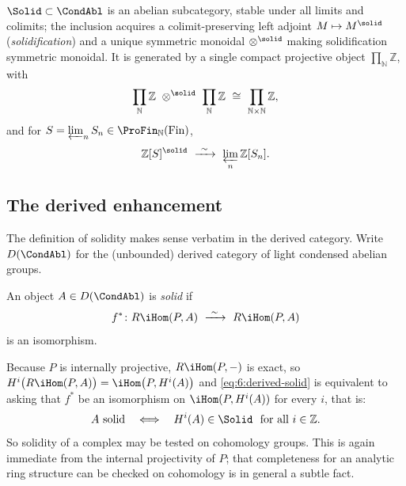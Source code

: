 \begin{theorem}
\label{thm:6:recall-structure}
$\Solid\subset\CondAbl$ is an abelian subcategory, stable under all limits and
colimits; the inclusion acquires a colimit-preserving left adjoint
$M\mapsto M^{\solid}$ (\emph{solidification}) and a unique symmetric monoidal
$\otimes^{\solid}$ making solidification symmetric monoidal. It is generated by a
single compact projective object $\prod_{\mathbb{N}}\mathbb{Z}$, with
\begin{equation}
\label{eq:6:generator-tensor-recall}
\prod_{\mathbb{N}}\mathbb{Z}\ \otimes^{\solid}\ \prod_{\mathbb{N}}\mathbb{Z}
\ \cong\ \prod_{\mathbb{N}\times\mathbb{N}}\mathbb{Z},
\end{equation}
and for $S=\varprojlim_n S_n\in\ProFin_{\mathbb{N}}(\mathrm{Fin})$,
\begin{equation*}
\mathbb{Z}[S]^{\solid}\ \xrightarrow{\ \sim\ }\ \varprojlim_{n}\mathbb{Z}[S_{n}].
\end{equation*}
\end{theorem}

\subsection{The derived enhancement}

The definition of solidity makes sense verbatim in the derived category. Write
$D(\CondAbl)$ for the (unbounded) derived category of light condensed abelian
groups.

\begin{definition}
\label{def:6:derived-solid}
An object $A\in D(\CondAbl)$ is \emph{solid} if
\begin{equation}
\label{eq:6:derived-solid}
f^{\ast}\colon R\iHom(P,A)\ \xrightarrow{\ \sim\ }\ R\iHom(P,A)
\end{equation}
is an isomorphism.
\end{definition}

Because $P$ is internally projective, $R\iHom(P,-)$ is exact, so
$H^{i}\bigl(R\iHom(P,A)\bigr)=\iHom\bigl(P,H^{i}(A)\bigr)$ and
\eqref{eq:6:derived-solid} is equivalent to asking that $f^{\ast}$ be an
isomorphism on $\iHom(P,H^{i}(A))$ for every $i$, that is:
\begin{equation*}
A\text{ solid}\quad\Longleftrightarrow\quad H^{i}(A)\in\Solid\ \text{ for all }i\in\mathbb{Z}.
\end{equation*}
So solidity of a complex may be tested on cohomology groups. This is again
immediate from the internal projectivity of $P$; that completeness for an
analytic ring structure can be checked on cohomology is in general a subtle fact.

